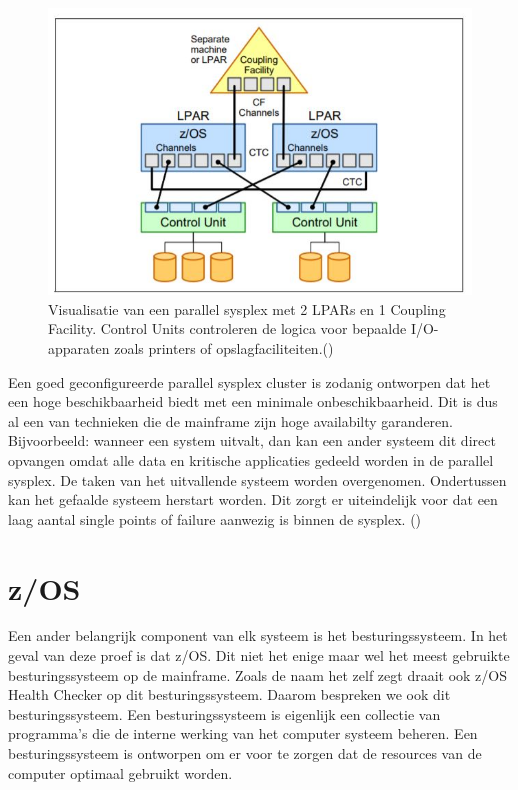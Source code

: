 \begin{figure}[h]
	\centering
	\includegraphics{img/ParallelSysplex}
	\caption[Visualisatie van een Parallel Sysplex]{Visualisatie van een parallel sysplex met 2 LPARs en 1 Coupling Facility. Control Units controleren de logica voor bepaalde I/O-apparaten zoals printers of opslagfaciliteiten.(\cite{Ebbers2011})}
	\label{fig:parallelsysplex}
\end{figure}

Een goed geconfigureerde parallel sysplex cluster is zodanig ontworpen dat het een hoge beschikbaarheid biedt met een minimale onbeschikbaarheid. Dit is dus al een van technieken die de mainframe zijn hoge availabilty garanderen. Bijvoorbeeld: wanneer een system uitvalt, dan kan een ander systeem dit direct opvangen omdat alle data en kritische applicaties gedeeld worden in de parallel sysplex. De taken van het uitvallende systeem worden overgenomen. Ondertussen kan het gefaalde systeem herstart worden. Dit zorgt er uiteindelijk voor dat een laag aantal single points of failure aanwezig is binnen de sysplex. (\cite{Ebbers2011})

\section{z/OS}
\label{subsec:z/OS}

Een ander belangrijk component van elk systeem is het besturingssysteem. In het geval van deze proef is dat z/OS. Dit niet het enige maar wel het meest gebruikte besturingssysteem op de mainframe. Zoals de naam het zelf zegt draait ook z/OS Health Checker op dit besturingssysteem. Daarom bespreken we ook dit besturingssysteem. Een besturingssysteem is eigenlijk een collectie van programma's die de interne werking van het computer systeem beheren. Een besturingssysteem is ontworpen om er voor te zorgen dat de resources van de computer optimaal gebruikt worden.

